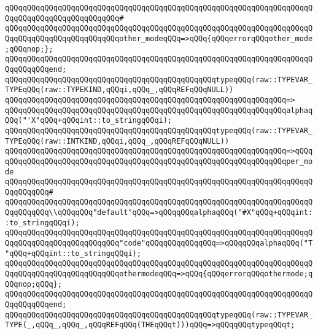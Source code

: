 \verb|qQQqqQQqqQQqqQQqqQQqqQQqqQQqqQQqqQQqqQQqqQQqqQQqqQQqqQQqqQQqqQQqqQQqqQQqqQQqqQQqqQQqqQQqqQQqqQQq#|\newline
\verb|qQQqqQQqqQQqqQQqqQQqqQQqqQQqqQQqqQQqqQQqqQQqqQQqqQQqqQQqqQQqqQQqqQQqqQQqqQQqqQQqqQQqqQQqqQQqqQQqother_modeqQQq=>qQQq{qQQqerrorqQQqother_mode;qQQqnop;};|\newline
\verb|qQQqqQQqqQQqqQQqqQQqqQQqqQQqqQQqqQQqqQQqqQQqqQQqqQQqqQQqqQQqqQQqqQQqqQQqqQQqqQQqend;|\newline
\newline
\verb|qQQqqQQqqQQqqQQqqQQqqQQqqQQqqQQqqQQqqQQqqQQqqQQqtypeqQQq(raw::TYPEVAR_TYPEqQQq(raw::TYPEKIND,qQQqi,qQQq_,qQQqREFqQQqNULL))|\newline
\verb|qQQqqQQqqQQqqQQqqQQqqQQqqQQqqQQqqQQqqQQqqQQqqQQqqQQqqQQqqQQqqQQq=>|\newline
\verb|qQQqqQQqqQQqqQQqqQQqqQQqqQQqqQQqqQQqqQQqqQQqqQQqqQQqqQQqqQQqqQQqalphaqQQq("'X"qQQq+qQQqint::to_stringqQQqi);|\newline
\newline
\verb|qQQqqQQqqQQqqQQqqQQqqQQqqQQqqQQqqQQqqQQqqQQqqQQqtypeqQQq(raw::TYPEVAR_TYPEqQQq(raw::INTKIND,qQQqi,qQQq_,qQQqREFqQQqNULL))|\newline
\verb|qQQqqQQqqQQqqQQqqQQqqQQqqQQqqQQqqQQqqQQqqQQqqQQqqQQqqQQqqQQqqQQq=>qQQq|\newline
\verb|qQQqqQQqqQQqqQQqqQQqqQQqqQQqqQQqqQQqqQQqqQQqqQQqqQQqqQQqqQQqqQQqper_mode|\newline
\verb|qQQqqQQqqQQqqQQqqQQqqQQqqQQqqQQqqQQqqQQqqQQqqQQqqQQqqQQqqQQqqQQqqQQqqQQqqQQqqQQq#|\newline
\verb|qQQqqQQqqQQqqQQqqQQqqQQqqQQqqQQqqQQqqQQqqQQqqQQqqQQqqQQqqQQqqQQqqQQqqQQqqQQqqQQq\\qQQqqQQq"default"qQQq=>qQQqqQQqalphaqQQq("#X"qQQq+qQQqint::to_stringqQQqi);|\newline
\verb|qQQqqQQqqQQqqQQqqQQqqQQqqQQqqQQqqQQqqQQqqQQqqQQqqQQqqQQqqQQqqQQqqQQqqQQqqQQqqQQqqQQqqQQqqQQqqQQq"code"qQQqqQQqqQQqqQQq=>qQQqqQQqalphaqQQq("T"qQQq+qQQqint::to_stringqQQqi);|\newline
\verb|qQQqqQQqqQQqqQQqqQQqqQQqqQQqqQQqqQQqqQQqqQQqqQQqqQQqqQQqqQQqqQQqqQQqqQQqqQQqqQQqqQQqqQQqqQQqqQQqothermodeqQQq=>qQQq{qQQqerrorqQQqothermode;qQQqnop;qQQq};|\newline
\verb|qQQqqQQqqQQqqQQqqQQqqQQqqQQqqQQqqQQqqQQqqQQqqQQqqQQqqQQqqQQqqQQqqQQqqQQqqQQqqQQqend;|\newline
\newline
\verb|qQQqqQQqqQQqqQQqqQQqqQQqqQQqqQQqqQQqqQQqqQQqqQQqtypeqQQq(raw::TYPEVAR_TYPE(_,qQQq_,qQQq_,qQQqREFqQQq(THEqQQqt)))qQQq=>qQQqqQQqtypeqQQqt;|\newline
